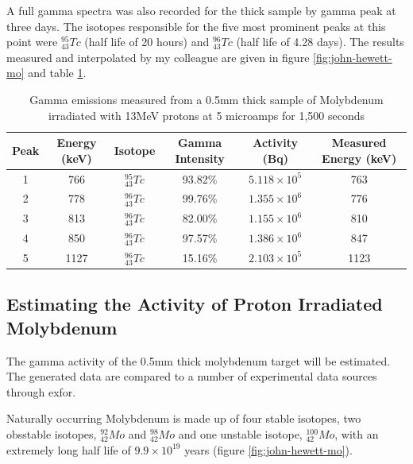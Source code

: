 A full gamma spectra was also recorded for the thick sample by gamma peak at three days.  The isotopes responsible for the five most prominent peaks at this point were ${}^{95}_{43}Tc$ (half life of 20 hours\cite{jeff311}) and ${}^{96}_{43}Tc$ (half life of 4.28 days\cite{jeff311}).  The results measured and interpolated by my colleague are given in figure \ref{fig:john-hewett-mo} and table \ref{table:johnhewettresults}.

\FloatBarrier
\begin{table}[h]
\begin{center}
\begin{tabular}{c c c c c c}
\hline\hline
Peak & Energy (keV) & Isotope & Gamma Intensity & Activity (Bq) & Measured Energy (keV)\\
\hline\hline
1 & 766 & ${}^{95}_{43}Tc$ & 93.82\% & $5.118 \times 10^{5}$ & 763 \\
2 & 778 & ${}^{96}_{43}Tc$ & 99.76\% & $1.355 \times 10^{6}$ & 776 \\
3 & 813 & ${}^{96}_{43}Tc$ & 82.00\% & $1.155 \times 10^{6}$ & 810 \\
4 & 850 & ${}^{96}_{43}Tc$ & 97.57\% & $1.386 \times 10^{6}$ & 847 \\
5 & 1127 & ${}^{96}_{43}Tc$ & 15.16\% & $2.103 \times 10^{5}$ & 1123 \\
\hline\hline
\end{tabular}
\end{center}
\caption{Gamma emissions measured from a 0.5mm thick sample of Molybdenum irradiated with 13MeV protons at 5 microamps for 1,500 seconds}
\label{table:johnhewettresults}
\end{table}



\subsection{Estimating the Activity of Proton Irradiated Molybdenum}
\label{section:estimatingmoactivity}

The gamma activity of the 0.5mm thick molybdenum target will be estimated.  The generated data are compared to a number of experimental data sources through \acrshort{exfor}.

Naturally occurring Molybdenum is made up of four stable isotopes, two \gls{obsstable} isotopes, ${}^{92}_{42}Mo$ and ${}^{98}_{42}Mo$ and one unstable isotope, ${}^{100}_{42}Mo$, with an extremely long half life of $9.9 \times 10^{19}$ years (figure \ref{fig:john-hewett-mo}).


